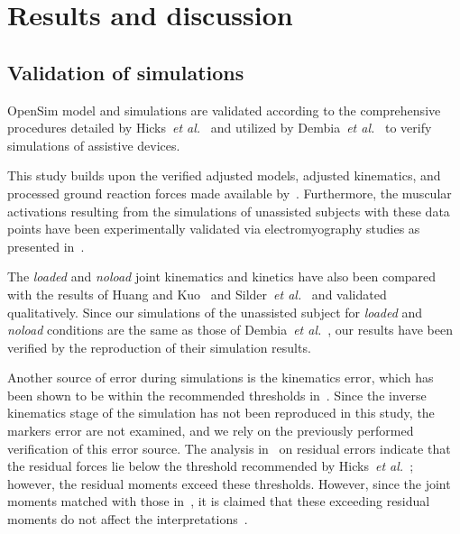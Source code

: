 \documentclass[10pt,letterpaper]{article}
\newcommand{\etal}{\textit{et al.}}
\begin{document}
\section*{Results and discussion}

\subsection*{Validation of simulations}

OpenSim model and simulations are validated according to the comprehensive procedures detailed by Hicks~\etal~\cite{Hicks2015} and utilized by Dembia~\etal~\cite{Dembia2017} to verify simulations of assistive devices.

This study builds upon the verified adjusted models, adjusted kinematics, and processed ground reaction forces made available by~\cite{Dembia2017}. Furthermore, the muscular activations resulting from the simulations of unassisted subjects with these data points have been experimentally validated via electromyography studies as presented in~\cite{Hicks2015,Dembia2017}. %

The \textit{loaded} and \textit{\textit{noload}} joint kinematics and kinetics have also been compared with the results of Huang and Kuo~\cite{Huang2014} and Silder~\etal~\cite{Silder2013} and validated qualitatively. Since our simulations of the unassisted subject for \textit{loaded} and \textit{noload} conditions are the same as those of Dembia~\etal~\cite{Dembia2017}, our results have been verified by the reproduction of their simulation results. %

Another source of error during simulations is the kinematics error, which has been shown to be within the recommended thresholds in~\cite{Dembia2017}. Since the inverse kinematics stage of the simulation has not been reproduced in this study, the markers error are not examined, and we rely on the previously performed verification of this error source. The analysis in~\cite{Dembia2017} on residual errors indicate that the residual forces lie below the threshold recommended by Hicks~\etal~\cite{Hicks2015}; however, the residual moments exceed these thresholds. However, since the joint moments matched with those in~\cite{Hicks2015}, it is claimed that these exceeding residual moments do not affect the interpretations~\cite{Huang2014,Silder2013}.
\end{document}
